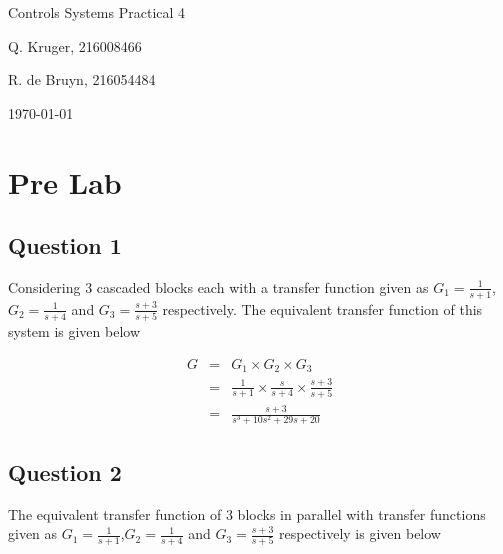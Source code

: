 \documentclass[12pt, a4paper]{article}
\begin{document}
		\begin{titlepage}
			\centering
			{\LARGE Controls Systems Practical 4 \par}
			\vspace*{1.5cm}
			{\large Q. Kruger, 216008466 \par}
			{\large R. de Bruyn, 216054484 \par}
			\vspace*{1.2cm}
			{\large \today}
			\vspace*{\fill}
			\vspace*{\fill}
		\end{titlepage}

		\tableofcontents
		\listoffigures
		\newpage

		\section{Pre Lab} %
		\label{sec:pre_lab}

		\subsection{Question 1} %
		\label{ssub:question_1}
		Considering 3 cascaded blocks each with a transfer function given as $G_1 = \frac{1}{s+1}$, $G_2 = \frac{1}{s+4}$ and $G_3 = \frac{s+3}{s+5}$ respectively. The equivalent transfer function of this system is given below

		\begin{equation}
			\begin{array}{rcl}
				G & = & G_1 \times G_2 \times G_3\\
				  & = & \frac{1}{s+1} \times \frac{s}{s+4} \times \frac{s+3}{s+5}\\
				  & = & \frac{s+3}{s^3+10s^2+29s+20}
			\end{array}
		\end{equation}
		

		\subsection{Question 2} %
		\label{sub:question_2}
		The equivalent transfer function of 3 blocks in parallel with transfer functions given as $G_1 = \frac{1}{s+1}$,$G_2 = \frac{1}{s+4}$ and $G_3 = \frac{s+3}{s+5}$ respectively is given below
\end{document}
